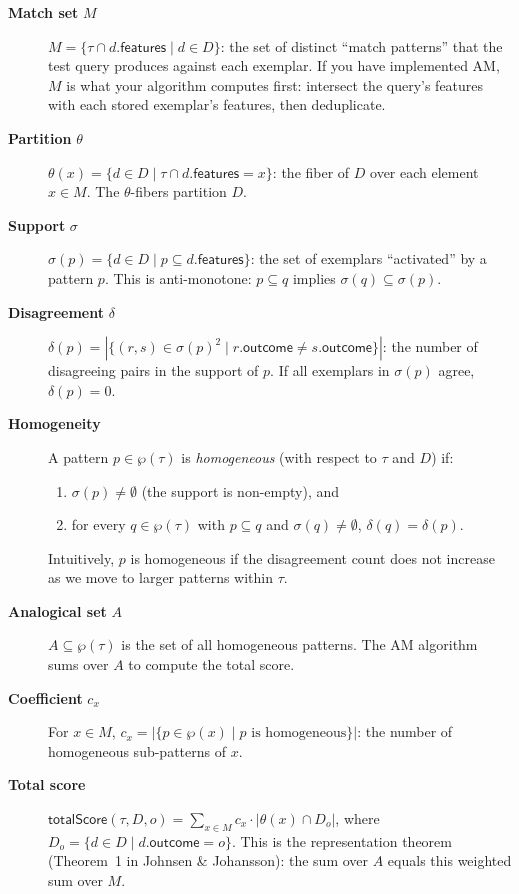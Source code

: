 \begin{description}
  \item[\textbf{Match set} $M$]
    $M = \{ \tau \cap d.\mathsf{features} \mid d \in D \}$: the set of distinct
    ``match patterns'' that the test query produces against each exemplar.
    If you have implemented AM, $M$ is what your algorithm computes first:
    intersect the query's features with each stored exemplar's features, then
    deduplicate.

  \item[\textbf{Partition} $\theta$]
    $\theta(x) = \{ d \in D \mid \tau \cap d.\mathsf{features} = x \}$: the
    fiber of $D$ over each element $x \in M$.  The $\theta$-fibers partition
    $D$.

  \item[\textbf{Support} $\sigma$]
    $\sigma(p) = \{ d \in D \mid p \subseteq d.\mathsf{features} \}$: the set
    of exemplars ``activated'' by a pattern $p$.  This is anti-monotone:
    $p \subseteq q$ implies $\sigma(q) \subseteq \sigma(p)$.

  \item[\textbf{Disagreement} $\delta$]
    $\delta(p) = |\{ (r,s) \in \sigma(p)^2 \mid r.\mathsf{outcome} \neq
    s.\mathsf{outcome} \}|$: the number of disagreeing pairs in the support of
    $p$.  If all exemplars in $\sigma(p)$ agree, $\delta(p) = 0$.

  \item[\textbf{Homogeneity}]
    A pattern $p \in \wp(\tau)$ is \emph{homogeneous} (with respect to $\tau$
    and $D$) if:
    \begin{enumerate}
      \item $\sigma(p) \neq \emptyset$ (the support is non-empty), and
      \item for every $q \in \wp(\tau)$ with $p \subseteq q$ and $\sigma(q)
            \neq \emptyset$, $\delta(q) = \delta(p)$.
    \end{enumerate}
    Intuitively, $p$ is homogeneous if the disagreement count does not increase
    as we move to larger patterns within $\tau$.

  \item[\textbf{Analogical set} $A$]
    $A \subseteq \wp(\tau)$ is the set of all homogeneous patterns.  The AM
    algorithm sums over $A$ to compute the total score.

  \item[\textbf{Coefficient} $c_x$]
    For $x \in M$, $c_x = |\{ p \in \wp(x) \mid p \text{ is homogeneous}\}|$:
    the number of homogeneous sub-patterns of $x$.

  \item[\textbf{Total score}]
    $\mathsf{totalScore}(\tau, D, o) = \sum_{x \in M} c_x \cdot
    |\theta(x) \cap D_o|$, where $D_o = \{d \in D \mid d.\mathsf{outcome} = o\}$.
    This is the representation theorem (Theorem~1 in Johnsen \& Johansson): the
    sum over $A$ equals this weighted sum over $M$.
\end{description}

